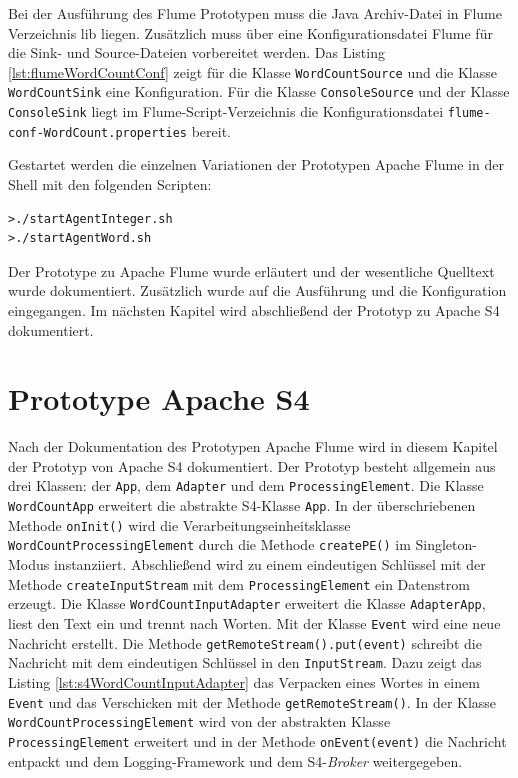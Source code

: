 Bei der Ausführung des Flume Prototypen muss die Java Archiv-Datei in Flume Verzeichnis lib liegen. Zusätzlich muss über eine Konfigurationsdatei Flume für die Sink- und Source-Dateien vorbereitet werden. Das Listing \ref{lst:flumeWordCountConf} zeigt für die Klasse \texttt{WordCountSource} und die Klasse \texttt{WordCountSink} eine Konfiguration. Für die Klasse \texttt{ConsoleSource} und der Klasse \texttt{ConsoleSink} liegt im Flume-Script-Verzeichnis die Konfigurationsdatei \texttt{flume-conf-WordCount.properties} bereit.



Gestartet werden die einzelnen Variationen der Prototypen Apache Flume in der Shell mit den folgenden Scripten:

\begin{verbatim}
>./startAgentInteger.sh
>./startAgentWord.sh
\end{verbatim}

Der Prototype zu Apache Flume wurde erläutert und der wesentliche Quelltext wurde dokumentiert. Zusätzlich wurde auf die Ausführung und die Konfiguration eingegangen. Im nächsten Kapitel wird abschließend der Prototyp zu Apache S4 dokumentiert.


\section{Prototype Apache S4}
\label{sec:prot:s4}

Nach der Dokumentation des Prototypen Apache Flume wird in diesem Kapitel der Prototyp von Apache S4 dokumentiert. Der Prototyp besteht allgemein aus drei Klassen: der \texttt{App}, dem \texttt{Adapter} und dem \texttt{ProcessingElement}. Die Klasse \texttt{WordCountApp} erweitert die abstrakte S4-Klasse \texttt{App}. In der überschriebenen Methode \texttt{onInit()} wird die Verarbeitungseinheitsklasse \texttt{WordCountProcessingElement} durch die Methode \texttt{createPE()} im Singleton-Modus instanziiert. Abschließend wird zu einem eindeutigen Schlüssel mit der Methode \texttt{createInputStream} mit dem \texttt{ProcessingElement} ein Datenstrom erzeugt. Die Klasse \texttt{WordCountInputAdapter} erweitert die Klasse \texttt{AdapterApp}, liest den Text ein und trennt nach Worten. Mit der Klasse \texttt{Event} wird eine neue Nachricht erstellt. Die Methode \texttt{getRemoteStream().put(event)} schreibt die Nachricht mit dem eindeutigen Schlüssel in den \texttt{InputStream}. Dazu zeigt das Listing \ref{lst:s4WordCountInputAdapter} das Verpacken eines Wortes in einem \texttt{Event} und das Verschicken mit der Methode \texttt{getRemoteStream()}. In der Klasse \texttt{WordCountProcessingElement} wird von der abstrakten Klasse \texttt{ProcessingElement} erweitert und in der Methode \texttt{onEvent(event)} die Nachricht entpackt und dem Logging-Framework und dem S4-\textit{Broker} weitergegeben.

